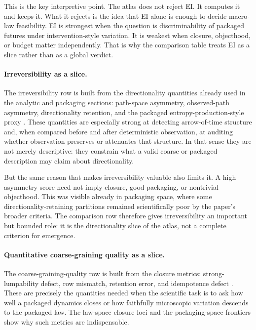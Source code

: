 \documentclass[11pt]{article}
\theoremstyle{definition}
\begin{document}
This is the key interpretive point. The atlas does not reject EI. It computes it and keeps it. What it rejects is the idea that EI alone is enough to decide macro-law feasibility. EI is strongest when the question is discriminability of packaged futures under intervention-style variation. It is weakest when closure, objecthood, or budget matter independently. That is why the comparison table treats EI as a slice rather than as a global verdict.

\paragraph{Irreversibility as a slice.}
The irreversibility row is built from the directionality quantities already used in the analytic and packaging sections: path-space asymmetry, observed-path asymmetry, directionality retention, and the packaged entropy-production-style proxy \cite{crooks1999entropy,seifert2012stochastic}. These quantities are especially strong at detecting arrow-of-time structure and, when compared before and after deterministic observation, at auditing whether observation preserves or attenuates that structure. In that sense they are not merely descriptive: they constrain what a valid coarse or packaged description may claim about directionality.

But the same reason that makes irreversibility valuable also limits it. A high asymmetry score need not imply closure, good packaging, or nontrivial objecthood. This was visible already in packaging space, where some directionality-retaining partitions remained scientifically poor by the paper's broader criteria. The comparison row therefore gives irreversibility an important but bounded role: it is the directionality slice of the atlas, not a complete criterion for emergence.

\paragraph{Quantitative coarse-graining quality as a slice.}
The coarse-graining-quality row is built from the closure metrics: strong-lumpability defect, row mismatch, retention error, and idempotence defect \cite{kemeny1960finite,buchholz1994lumpability,hilder2024quantitative}. These are precisely the quantities needed when the scientific task is to ask how well a packaged dynamics closes or how faithfully microscopic variation descends to the packaged law. The law-space closure loci and the packaging-space frontiers show why such metrics are indispensable.
\end{document}
